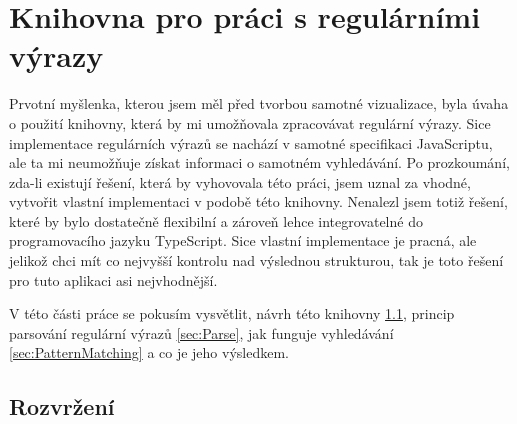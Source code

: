 \chapter{Knihovna pro práci s regulárními výrazy}\label{sec:Implementation1}

Prvotní myšlenka, kterou jsem měl před tvorbou samotné vizualizace, byla úvaha o použití knihovny, 
která by mi umožňovala zpracovávat regulární výrazy.
Sice implementace regulárních výrazů se nachází v samotné specifikaci JavaScriptu,
ale ta mi neumožňuje získat informaci o samotném vyhledávání.
Po prozkoumání, zda-li existují řešení, která by vyhovovala této práci, 
jsem uznal za vhodné, vytvořit vlastní implementaci v podobě této knihovny.
Nenalezl jsem totiž řešení, které by bylo dostatečně flexibilní a 
zároveň lehce integrovatelné do programovacího jazyku TypeScript.
Sice vlastní implementace je pracná, ale jelikož chci mít co nejvyšší kontrolu nad výslednou strukturou, 
tak je toto řešení pro tuto aplikaci asi nejvhodnější. 

V této části práce se pokusím vysvětlit, návrh této knihovny \ref{sec:Imp1LayoutReal}, 
princip parsování regulární výrazů \ref{sec:Parse}, jak funguje vyhledávání \ref{sec:PatternMatching} a co je jeho výsledkem. %

\section{Rozvržení}\label{sec:Imp1LayoutReal}

